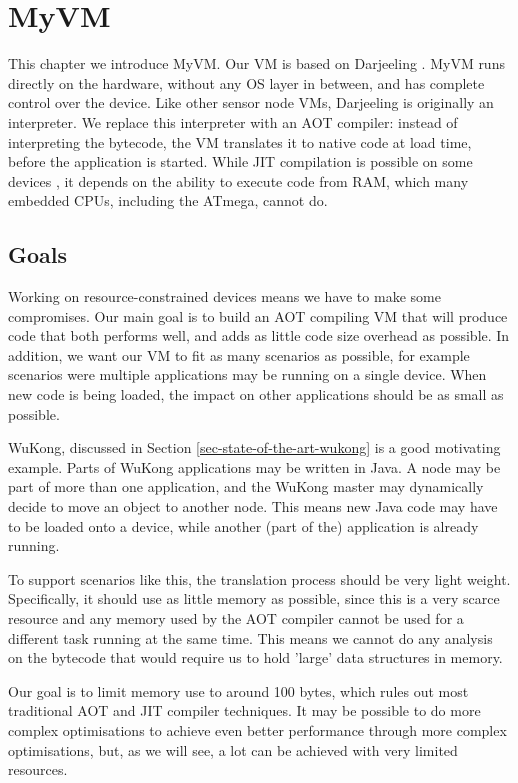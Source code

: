 \chapter{MyVM}

This chapter we introduce MyVM. Our VM is based on Darjeeling \cite{Brouwers:2009cj}. MyVM runs directly on the hardware, without any OS layer in between, and has complete control over the device. Like other sensor node VMs, Darjeeling is originally an interpreter. We replace this interpreter with an AOT compiler: instead of interpreting the bytecode, the VM translates it to native code at load time, before the application is started. While JIT compilation is possible on some devices \cite{Ellul:2012thesis}, it depends on the ability to execute code from RAM, which many embedded CPUs, including the ATmega, cannot do.

\section{Goals}
\label{sec-myvm-goals}
Working on resource-constrained devices means we have to make some compromises. Our main goal is to build an AOT compiling VM that will produce code that both performs well, and adds as little code size overhead as possible. In addition, we want our VM to fit as many scenarios as possible, for example scenarios were multiple applications may be running on a single device. When new code is being loaded, the impact on other applications should be as small as possible.

WuKong, discussed in Section \ref{sec-state-of-the-art-wukong} is a good motivating example. Parts of WuKong applications may be written in Java. A node may be part of more than one application, and the WuKong master may dynamically decide to move an object to another node. This means new Java code may have to be loaded onto a device, while another (part of the) application is already running.

To support scenarios like this, the translation process should be very light weight. Specifically, it should use as little memory as possible, since this is a very scarce resource and any memory used by the AOT compiler cannot be used for a different task running at the same time. This means we cannot do any analysis on the bytecode that would require us to hold 'large' data structures in memory.

Our goal is to limit memory use to around 100 bytes, which rules out most traditional AOT and JIT compiler techniques. It may be possible to do more complex optimisations to achieve even better performance through more complex optimisations, but, as we will see, a lot can be achieved with very limited resources.

